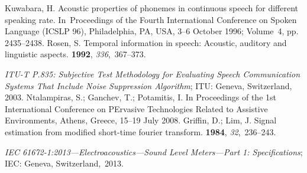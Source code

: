\documentclass[sensors,article,accept,moreauthors,pdftex,10pt,a4paper]{mdpi}
\begin{document}
\begin{thebibliography}{999}
Kuwabara, H.
\newblock Acoustic properties of phonemes in continuous speech for different
  speaking rate.
\newblock  In~Proceedings of the Fourth International  Conference on Spoken Language (ICSLP 96),  {Philadelphia, PA, USA, 3--6 October} 1996; Volume~4, pp. 2435--2438.
Rosen, S.
\newblock Temporal information in speech: Acoustic, auditory and linguistic
  aspects.
 {\bf 1992}, {\em 336},~367--373.

{\em ITU-T P.835: Subjective Test Methodology for Evaluating Speech Communication
  Systems That Include Noise Suppression Algorithm}; {ITU: Geneva, Switzerland,} 2003.
Ntalampiras, S.; Ganchev, T.; Potamitis, I.
\newblock  In Proceedings of the 1st International Conference on PErvasive Technologies Related to
  Assistive Environments, {Athens, Greece, 15--19 July} 2008.
Griffin, D.; Lim, J.
\newblock Signal estimation from modified short-time fourier transform.
  {\bf 1984}, {\em 32},~236--243.

{\em IEC 61672-1:2013---Electroacoustics---Sound Level Meters---Part 1:
  Specifications}; {IEC: Geneva, Switzerland,}~2013.
\end{thebibliography}

\end{document}
